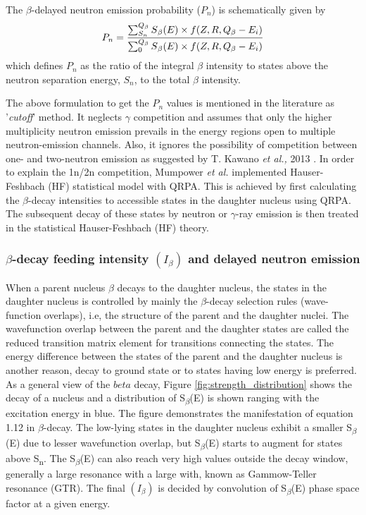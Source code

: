 \documentclass[a4paper,12pt,twoside]{report}
\begin{document}
 The $\beta$-delayed neutron emission probability ($P_{n}$) is schematically given by 
 \begin{equation}
     P_{n}=\frac{\sum_{S_{n}}^{Q_{\beta}} S\textsubscript{$\beta$}(E)\times f(Z,R,Q_{\beta}-E_{i})}{\sum_{0}^{Q_{\beta}} S\textsubscript{$\beta$}(E)\times f(Z,R,Q_{\beta}-E_{i})}
 \end{equation}
 which defines $P_{n}$ as the ratio of the integral $\beta$ intensity to states above the neutron separation energy, $S_{n}$, to the total $\beta$ intensity. 
 
 The above formulation to get the $P_{n}$ values is mentioned in the literature as '\textit{cutoff}' method. It neglects $\gamma$ competition and assumes that only the higher multiplicity neutron emission prevails in the energy regions open to multiple neutron-emission channels. Also, it ignores the possibility of competition between one- and two-neutron emission as suggested by T. Kawano \textit{et al.,} 2013 \cite{kwano2013}. In order to explain the 1n/2n competition, Mumpower \textit{et al.} \cite{moller2016} implemented Hauser-Feshbach (HF) statistical model with QRPA. This is achieved by first calculating the $\beta$-decay intensities to accessible states in the daughter nucleus using QRPA. The subsequent decay of these states by neutron or $\gamma$-ray emission is then treated in the statistical Hauser-Feshbach (HF) theory. 
 
 
 \subsubsection{$\beta$-decay feeding intensity $(I_{\beta})$  and delayed neutron emission}
 When a parent nucleus $\beta$ decays to the daughter nucleus, the states in the daughter nucleus is controlled by mainly the $\beta$-decay selection rules (wave-function overlaps), i.e, the structure of the parent and the daughter nuclei. The wavefunction overlap between the parent and the daughter states are called the reduced transition matrix element for transitions connecting the states. The energy difference between the states of the parent and the daughter nucleus is another reason, decay to ground state or to states having low energy is preferred. As a general view of the $beta$ decay, Figure \ref{fig:strength_distribution} shows the decay of a nucleus and a distribution of S\textsubscript{$\beta$}(E) is shown ranging with the excitation energy in blue. The figure demonstrates the manifestation of equation 1.12 in $\beta$-decay. The low-lying states in the daughter nucleus exhibit a smaller S\textsubscript{$\beta$}(E) due to lesser wavefunction overlap, but S\textsubscript{$\beta$}(E) starts to augment for states above S\textsubscript{n}. The S\textsubscript{$\beta$}(E) can also reach very high values outside the decay window, generally a large resonance with a large with, known as Gammow-Teller resonance (GTR). The final $(I_{\beta})$ is decided by convolution of S\textsubscript{$\beta$}(E) phase space factor at a given energy. 
 
\end{document}
